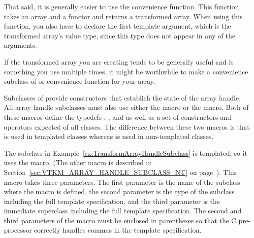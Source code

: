 That said, it is generally easier to use the
 convenience function. This function
takes an array and a functor and returns a transformed array. When using
this function, you also have to declare the first template argument, which
is the transformed array's value type, since this type does not appear in
any of the arguments.


If the transformed array you are creating tends to be generally useful and
is something you use multiple times, it might be worthwhile to make a
convenience subclass of  or convenience
 function for your array.


\label{sec:VTKM_ARRAY_HANDLE_SUBCLASS}

Subclasses of  provide constructors that
establish the state of the array handle. All array handle subclasses must
also use either the  macro or the
 macro. Both of these macros
define the typedefs , , and
 as well as a set of constructors and operators
expected of all  classes. The difference
between these two macros is that 
is used in templated classes whereas
 is used in non-templated
classes.

The  subclass in
Example~\ref{ex:TransformArrayHandleSubclass} is templated, so it uses the
 macro. (The other macro is
described in Section~\ref{sec:VTKM_ARRAY_HANDLE_SUBCLASS_NT} on
page~\pageref{sec:VTKM_ARRAY_HANDLE_SUBCLASS_NT}). This macro takes three
parameters. The first parameter is the name of the subclass where the macro
is defined, the second parameter is the type of the subclass including the
full template specification, and the third parameter is the immediate
superclass including the full template specification. The second and third
parameters of the macro must be enclosed in parentheses so that the C
pre-processor correctly handles commas in the template specification.


